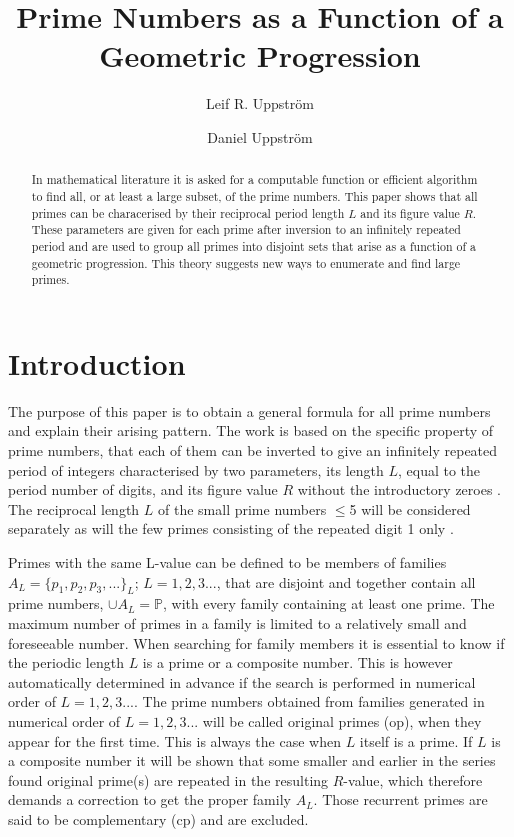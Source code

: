 \documentclass[10pt,twoside,a4paper]{amsart}
\author{Leif R. Uppstr\"om}
\author{Daniel Uppstr\"om}
\title{Prime Numbers as a Function of a Geometric Progression}
\begin{document}
\maketitle

\begin{abstract}
In mathematical literature it is asked for a computable function or efficient algorithm to find all, or at least a large subset, of the prime numbers. This paper shows that all primes can be characerised by their reciprocal period length $L$ and its figure value $R$. These parameters are given for each prime after inversion to an infinitely repeated period and are used to group all primes into disjoint sets that arise as a function of a geometric progression. This theory suggests new ways to enumerate and find large primes.
\end{abstract}

\section{Introduction}

The purpose of this paper is to obtain a general formula for all prime numbers and explain their arising pattern. The work is based on the specific property of prime numbers, that each of them can be inverted to give an infinitely repeated period of integers characterised by two parameters, its length $L$, equal to the period number of digits, and its figure value $R$ without the introductory zeroes \cite{Ore}. The reciprocal length $L$ of the small prime numbers ${\leq}$5 will be considered separately as will the few primes consisting of the repeated digit 1 only \cite{Beiler}.

Primes with the same L-value can be defined to be members of families $A_{L} = \{p_{1},p_{2},p_{3},...\}_{L}$; $L = 1,2,3...$, that are disjoint and together contain all prime numbers, $\cup A_{L}=\mathbb{P}$, with every family containing at least one prime. The maximum number of primes in a family is limited to a relatively small and foreseeable number. When searching for family members it is essential to know if the periodic length $L$ is a prime or a composite number. This is however automatically determined in advance if the search is performed in numerical order of $L = 1,2,3...$. The prime numbers obtained from families generated in numerical order of $L = 1,2,3...$ will be called original primes (op), when they appear for the first time. This is always the case when $L$ itself is a prime. If $L$ is a composite number it will be shown that some smaller and earlier in the series found original prime(s) are repeated in the resulting $R$-value, which therefore demands a correction to get the proper family $A_{L}$. Those recurrent primes are said to be complementary (cp) and are excluded.
\end{document}

